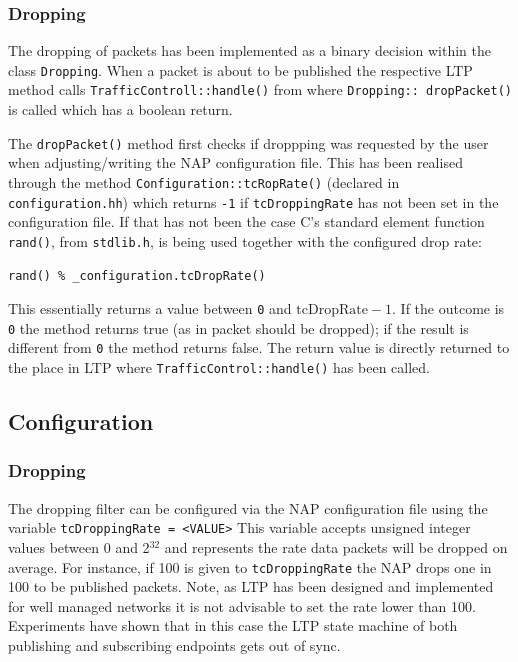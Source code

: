 \documentclass[a4paper,11pt,titlepage]{report}
\begin{document}
\subsubsection{Dropping}
The dropping of packets has been implemented as a binary decision within the class \texttt{Dropping}. When a packet is about to be published the respective \ac{LTP} method calls \texttt{TrafficControll::handle()} from where \texttt{Dropping:: dropPacket()} is called which has a boolean return. 

The \texttt{dropPacket()} method first checks if droppping was requested by the user when adjusting/writing the \ac{NAP} configuration file. This has been realised through the method \texttt{Configuration::tcRopRate()} (declared in \texttt{configuration.hh}) which returns \texttt{-1} if \texttt{tcDroppingRate} has not been set in the configuration file. If that has not been the case C's standard element function \texttt{rand()}, from \texttt{stdlib.h}, is being used together with the configured drop rate:

\begin{lstlisting}
rand() % _configuration.tcDropRate()
\end{lstlisting}

This essentially returns a value between \texttt{0} and $\text{tcDropRate} - 1$. If the outcome is \texttt{0} the method returns true (as in packet should be dropped); if the result is different from \texttt{0} the method returns false. The return value is directly returned to the place in \ac{LTP} where \texttt{TrafficControl::handle()} has been called.

\subsection{Configuration}
\subsubsection{Dropping}
The dropping filter can be configured via the \ac{NAP} configuration file using the variable
\newline
\newline
\texttt{tcDroppingRate = <VALUE>}
\newline
\newline
This variable accepts unsigned integer values between 0 and 2$^{32}$ and represents the rate data packets will be dropped on average. For instance, if 100 is given to \texttt{tcDroppingRate} the NAP drops one in 100 to be published packets. Note, as \ac{LTP} has been designed and implemented for well managed networks it is not advisable to set the rate lower than 100. Experiments have shown that in this case the \ac{LTP} state machine of both publishing and subscribing endpoints gets out of sync.

 
\end{document}
